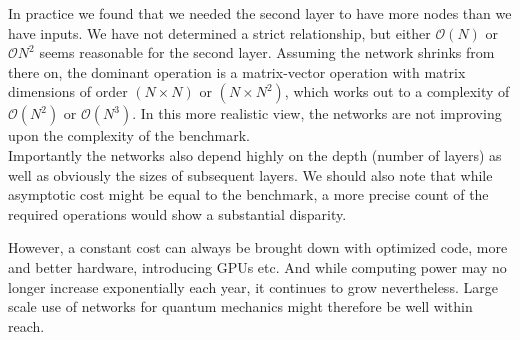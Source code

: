 \documentclass[Thesis.tex]{subfiles}
\begin{document}
In practice we found that we needed the second layer to have more
nodes than we have inputs. We have not determined a strict relationship, but
either $\mathcal{O}(N)$ or $\mathcal{O}{N^2}$ seems reasonable for the second
layer. Assuming the network shrinks from there on, the dominant operation is a
matrix-vector operation with matrix dimensions of order $(N\times N)$ or $(N\times N^2)$,
which works out to a complexity of $\mathcal{O}(N^2)$ or $\mathcal{O}(N^3)$. In
this more realistic view, the networks are not improving upon the complexity of
the benchmark.\\

Importantly the networks also depend highly on the depth (number of layers) as
well as obviously the sizes of subsequent layers. We should also note that while
asymptotic cost might be equal to the benchmark, a more precise count of the
required operations would show a substantial disparity.

However, a constant cost can always be brought down with optimized code, more
and better hardware, introducing GPUs etc. And while computing power may no
longer increase exponentially each year, it continues to grow nevertheless.
Large scale use of networks for quantum mechanics might therefore be well
within reach.
\end{document}

